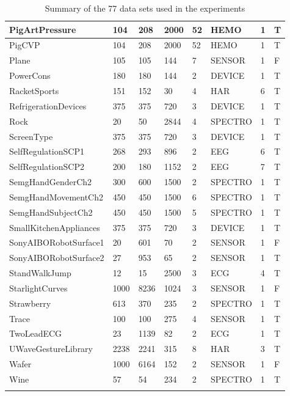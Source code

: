 \begin{landscape}
\begin{longtable}{|*{8}l|}
        PigArtPressure & 104 & 208 & 2000 & 52 & HEMO & 1 & T \\
        \hline
        PigCVP & 104 & 208 & 2000 & 52 & HEMO & 1 & T \\
        \hline
        Plane & 105 & 105 & 144 & 7 & SENSOR & 1 & F \\
        \hline
        PowerCons & 180 & 180 & 144 & 2 & DEVICE & 1 & T \\
        \hline
        RacketSports & 151 & 152 & 30 & 4 & HAR & 6 & T \\
        \hline
        RefrigerationDevices & 375 & 375 & 720 & 3 & DEVICE & 1 & T \\
        \hline
        Rock & 20 & 50 & 2844 & 4 & SPECTRO & 1 & T \\
        \hline
        ScreenType & 375 & 375 & 720 & 3 & DEVICE & 1 & T \\
        \hline
        SelfRegulationSCP1 & 268 & 293 & 896 & 2 & EEG & 6 & T \\
        \hline
        SelfRegulationSCP2 & 200 & 180 & 1152 & 2 & EEG & 7 & T \\
        \hline
        SemgHandGenderCh2 & 300 & 600 & 1500 & 2 & SPECTRO & 1 & T \\
        \hline
        SemgHandMovementCh2 & 450 & 450 & 1500 & 6 & SPECTRO & 1 & T \\
        \hline
        SemgHandSubjectCh2 & 450 & 450 & 1500 & 5 & SPECTRO & 1 & T \\
        \hline
        SmallKitchenAppliances & 375 & 375 & 720 & 3 & DEVICE & 1 & T \\
        \hline
        SonyAIBORobotSurface1 & 20 & 601 & 70 & 2 & SENSOR & 1 & F \\
        \hline
        SonyAIBORobotSurface2 & 27 & 953 & 65 & 2 & SENSOR & 1 & T \\
        \hline
        StandWalkJump & 12 & 15 & 2500 & 3 & ECG & 4 & T \\
        \hline
        StarlightCurves & 1000 & 8236 & 1024 & 3 & SENSOR & 1 & F \\
        \hline
        Strawberry & 613 & 370 & 235 & 2 & SPECTRO & 1 & T \\
        \hline
        Trace & 100 & 100 & 275 & 4 & SENSOR & 1 & T \\
        \hline
        TwoLeadECG & 23 & 1139 & 82 & 2 & ECG & 1 & T \\
        \hline
        UWaveGestureLibrary & 2238 & 2241 & 315 & 8 & HAR & 3 & T \\
        \hline
        Wafer & 1000 & 6164 & 152 & 2 & SENSOR & 1 & F \\
        \hline
        Wine & 57 & 54 & 234 & 2 & SPECTRO & 1 & T \\
        \hline
        \caption{Summary of the 77 data sets used in the experiments} \label{tab:long}
    \end{longtable}
\end{landscape}


